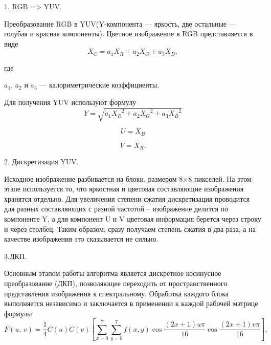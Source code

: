     1. RGB => YUV.
    
    Преобразование RGB  в YUV(Y-компонента --- яркость, две остальные --- голубая и красная компоненты). Цветное изображение в RGB представляется в виде
     \begin{equation}
      X_C = a_{1}X_R + a_{2}X_G + a_{3}X_B,
\end{equation}     
     
     где
     
      \(a_1\), \(a_2\) и \(a_3\) --- калориметрические коэффициенты.
    
    Для получения YUV используют формулу 
    \begin{equation}
    Y = \sqrt{a_{1}{X_R}^2 + a_{2}{X_G}^2 + a_{3}{X_B}^2}      
    \end{equation}
    
   
    
    \begin{equation}
    U = X_B
    \end{equation}
    
    \begin{equation}
    V = X_R.
    \end{equation}
    
    2. Дискретизация YUV.
    
    Исходное изображение разбивается на блоки, размером 8×8 пикселей. На этом этапе используется то, что яркостная и цветовая составляющие изображения хранятся отдельно. Для увеличения степени сжатия дискретизация проводится для разных составляющих с разной частотой – изображение делится по компоненте Y, а для компонент U и V цветовая информация берется через строку и через столбец. Таким образом, сразу получаем степень сжатия в два раза, а на качестве изображения это сказывается не сильно.
    
    3.ДКП.
    
    Основным этапом работы алгоритма является дискретное косинусное преобразование (ДКП), позволяющее переходить от пространственного представления изображения к спектральному. Обработка каждого блока выполняется независимо и заключается в применении к каждой рабочей матрице формулы  \cite{JPEG2}
    \begin{equation}
      F(\textit{u, v}) = \frac{1}{4} C(\textit{u}) C(\textit{v}) \left[ { 
		\displaystyle\sum_{x=0}^{7}   \displaystyle\sum_{y=0}^{7}   \textit{f} (x, y) 
		\cos \frac{(2x + 1) \textit{u} \pi }{16} \cos \frac{(2x + 1) \textit{v} \pi }{16}
 	} \right], 
    \end{equation}
  
